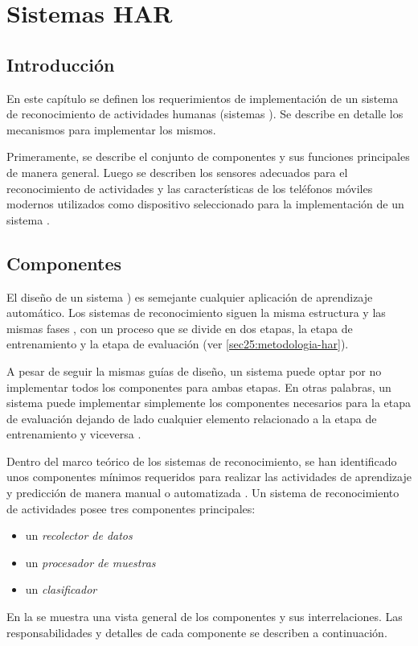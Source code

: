 
\chapter{Sistemas HAR }

\label{chap4:sistemas-de-reconocimiento}

\section{Introducción}

\label{sec41:introduccion}

En este capítulo se definen los requerimientos de implementación de
un sistema de reconocimiento de actividades humanas (sistemas ).
Se describe en detalle los mecanismos para implementar los mismos. 

Primeramente, se describe el conjunto de componentes y sus funciones
principales de manera general. Luego se describen los sensores adecuados
para el reconocimiento de actividades y las características de los
teléfonos móviles modernos utilizados como dispositivo seleccionado
para la implementación de un sistema .

\section{Componentes}

El diseño de un sistema ) es semejante cualquier aplicación
de aprendizaje automático. Los sistemas de reconocimiento siguen la
misma estructura y las mismas fases \cite{LaraLabrador2013}, con
un proceso que se divide en dos etapas, la etapa de entrenamiento
y la etapa de evaluación (ver \ref{sec25:metodologia-har}). 

A pesar de seguir la mismas guías de diseño, un sistema puede optar
por no implementar todos los componentes para ambas etapas. En otras
palabras, un sistema puede implementar simplemente los componentes
necesarios para la etapa de evaluación dejando de lado cualquier elemento
relacionado a la etapa de entrenamiento y viceversa . 

Dentro del marco teórico de los sistemas de reconocimiento, se han
identificado unos componentes mínimos requeridos para realizar las
actividades de aprendizaje y predicción de manera manual o automatizada
\cite{Choudhury2008}. Un sistema de reconocimiento de actividades
posee tres componentes principales:
\begin{itemize}
\item un \emph{recolector de datos}
\item un\emph{ procesador de muestras} 
\item un \emph{clasificador }
\end{itemize}
En la  se muestra una vista general
de los componentes y sus interrelaciones. Las responsabilidades y
detalles de cada componente se describen a continuación. 

